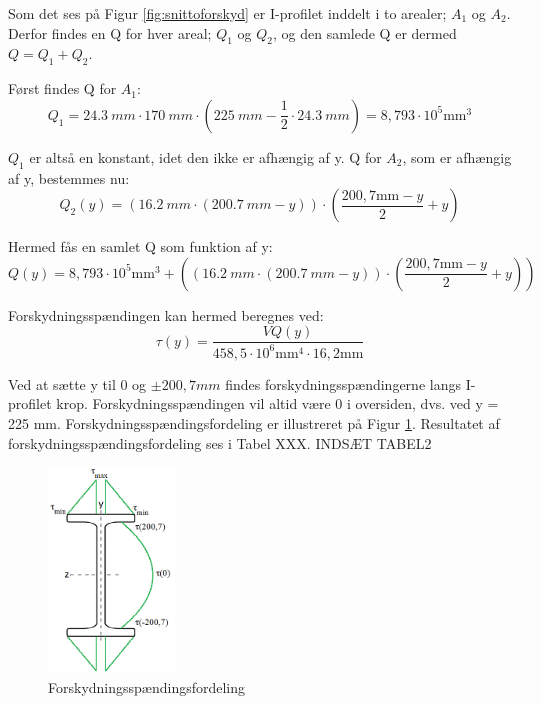 Som det ses på Figur \ref{fig:snittoforskyd} er I-profilet inddelt i to arealer; $A_1$ og $A_2$. Derfor findes en Q for hver areal; $Q_1$ og $Q_2$, og den samlede Q er dermed $Q = Q_1 + Q_2$. 

Først findes Q for $A_1$:
\begin{equation}
	Q_1 = \SI{24,3}{mm} \cdot \SI{170}{mm} \cdot (\SI{225}{mm} - \frac{1}{2} \cdot \SI{24,3}{mm}) = 8,\!793 \cdot 10^5 \text{mm}^3
\end{equation}

$Q_1$ er altså en konstant, idet den ikke er afhængig af y.
\newline
\newline
Q for $A_2$, som er afhængig af y, bestemmes nu:
\begin{equation}
Q_2(y) = (\SI{16,2}{mm} \cdot (\SI{200,7}{mm} -y)) \cdot (\frac{200\!,7 \text{mm} -y}{2} + y)
\end{equation}

Hermed fås en samlet Q som funktion af y:
\begin{equation}
	Q(y) = 8,\!793 \cdot 10^5 \text{mm}^3 + ((\SI{16,2}{mm} \cdot (\SI{200,7}{mm} -y)) \cdot (\frac{200\!,7 \text{mm} -y}{2} + y))
\end{equation}

Forskydningsspændingen kan hermed beregnes ved:
\begin{equation}
	\tau(y) = \frac{V Q(y)}{458,\!5 \cdot 10^6 \text{mm}^4 \cdot 16,\!2 \text{mm}}
\end{equation}

Ved at sætte y til 0 og $\pm 200,7 mm$ findes forskydningsspændingerne langs I-profilet krop. Forskydningsspændingen vil altid være 0 i oversiden, dvs. ved y = 225 mm. Forskydningsspændingsfordeling er illustreret på Figur \ref{fig:forskydfordeling}. Resultatet af forskydningsspændingsfordeling ses i Tabel XXX.  
\newline
\newline
INDSÆT TABEL2

\begin{figure}[H]
	\centering
	\includegraphics[width=0.3\textwidth]{billeder/forskydningsfordeling.png}
	\caption{Forskydningsspændingsfordeling}
	\label{fig:forskydfordeling}
\end{figure}

